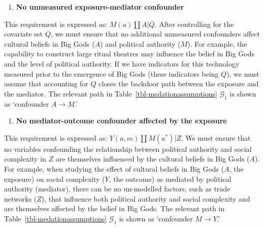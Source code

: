 \documentclass[
  single column]{article}
\providecommand{\tightlist}{%
  \setlength{\itemsep}{0pt}\setlength{\parskip}{0pt}}\usepackage{longtable,booktabs,array}
\begin{document}
\begin{enumerate}
\def\labelenumi{\arabic{enumi}.}
\setcounter{enumi}{2}
\tightlist
\item
  \textbf{No unmeasured exposure-mediator confounder}
\end{enumerate}

This requirement is expressed as: \(M(a) \coprod A | Q\). After
controlling for the covariate set \(Q\), we must ensure that no
additional unmeasured confounders affect cultural beliefs in Big Gods
(\(A\)) and political authority (\(M\)). For example, the capability to
construct large ritual theatres may influence the belief in Big Gods and
the level of political authority. If we have indicators for this
technology measured prior to the emergence of Big Gods (these indicators
being \(Q\)), we must assume that accounting for \(Q\) closes the
backdoor path between the exposure and the mediator. The relevant path
in Table~\ref{tbl-medationassumptions} \(\mathcal{G}_1\) is shown as
`confounder \(A \to M\).'

\begin{enumerate}
\def\labelenumi{\arabic{enumi}.}
\setcounter{enumi}{3}
\tightlist
\item
  \textbf{No mediator-outcome confounder affected by the exposure}
\end{enumerate}

This requirement is expressed as: \(Y(a,m) \coprod M(a^*) | Z\). We must
ensure that no variables confounding the relationship between political
authority and social complexity in \(Z\) are themselves influenced by
the cultural beliefs in Big Gods (\(A\)). For example, when studying the
effect of cultural beliefs in Big Gods (\(A\), the exposure) on social
complexity (\(Y\), the outcome) as mediated by political authority
(mediator), there can be no un-modelled factors, such as trade networks
(\(Z\)), that influence both political authority and social complexity
and are themselves affected by the belief in Big Gods. The relevant path
in Table~\ref{tbl-medationassumptions} \(\mathcal{G}_1\) is shown as
`confounder \(M \to Y\).'
\end{document}
